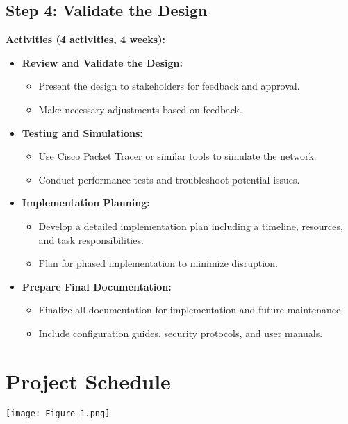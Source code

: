 \documentclass[12pt]{article}
\begin{document}
\subsection{Step 4: Validate the Design}

\textbf{Activities (4 activities, 4 weeks):}

\begin{itemize}
    \item \textbf{Review and Validate the Design:}
        \begin{itemize}
            \item Present the design to stakeholders for feedback and approval.
            \item Make necessary adjustments based on feedback.
        \end{itemize}
    \item \textbf{Testing and Simulations:}
        \begin{itemize}
            \item Use Cisco Packet Tracer or similar tools to simulate the network.
            \item Conduct performance tests and troubleshoot potential issues.
        \end{itemize}
    \item \textbf{Implementation Planning:}
        \begin{itemize}
            \item Develop a detailed implementation plan including a timeline, resources, and task responsibilities.
            \item Plan for phased implementation to minimize disruption.
        \end{itemize}
    \item \textbf{Prepare Final Documentation:}
        \begin{itemize}
            \item Finalize all documentation for implementation and future maintenance.
            \item Include configuration guides, security protocols, and user manuals.
        \end{itemize}
\end{itemize}

\section{Project Schedule}

\newpage
\begin{landscape}
    \texttt{[image: Figure\_1.png]} 
\end{landscape}
\end{document}
